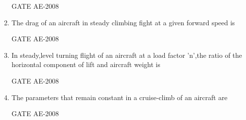 \documentclass[journal,12pt,onecolumn]{IEEEtran}
\theoremstyle{remark}
\begin{document}
\begin{enumerate}
\hfill{GATE AE-2008}
\quad

\item The drag of an aircraft in steady climbing fight at a given forward speed is \\
\begin{enumerate}
\end{enumerate}
\hfill{GATE AE-2008}

\quad

\item In steady,level turning flight of an aircraft at a load factor 'n',the ratio of the horizontal component of lift and aircraft weight is \\
\begin{enumerate}
\end{enumerate}
\hfill{GATE AE-2008}

\quad

\item The parameters that remain constant in a cruise-climb of an aircraft are\\ 
\begin{enumerate}
\end{enumerate}
\hfill{GATE AE-2008}


\end{enumerate}
\end{document}
